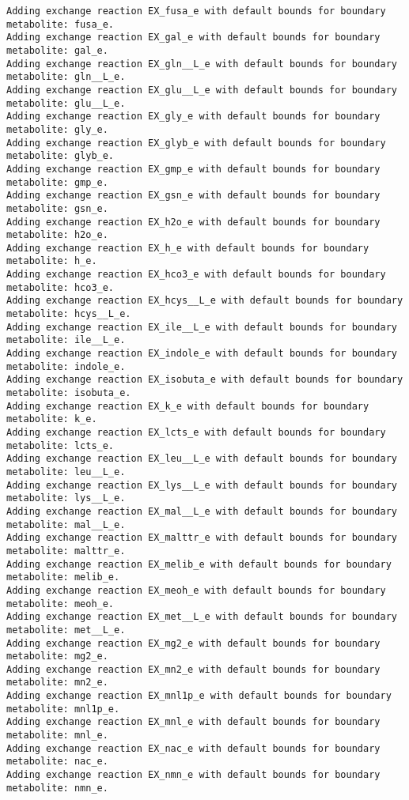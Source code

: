 \documentclass[
  letterpaper,
  DIV=11,
  numbers=noendperiod]{scrartcl}
\begin{document}
\begin{verbatim}
Adding exchange reaction EX_fusa_e with default bounds for boundary metabolite: fusa_e.
Adding exchange reaction EX_gal_e with default bounds for boundary metabolite: gal_e.
Adding exchange reaction EX_gln__L_e with default bounds for boundary metabolite: gln__L_e.
Adding exchange reaction EX_glu__L_e with default bounds for boundary metabolite: glu__L_e.
Adding exchange reaction EX_gly_e with default bounds for boundary metabolite: gly_e.
Adding exchange reaction EX_glyb_e with default bounds for boundary metabolite: glyb_e.
Adding exchange reaction EX_gmp_e with default bounds for boundary metabolite: gmp_e.
Adding exchange reaction EX_gsn_e with default bounds for boundary metabolite: gsn_e.
Adding exchange reaction EX_h2o_e with default bounds for boundary metabolite: h2o_e.
Adding exchange reaction EX_h_e with default bounds for boundary metabolite: h_e.
Adding exchange reaction EX_hco3_e with default bounds for boundary metabolite: hco3_e.
Adding exchange reaction EX_hcys__L_e with default bounds for boundary metabolite: hcys__L_e.
Adding exchange reaction EX_ile__L_e with default bounds for boundary metabolite: ile__L_e.
Adding exchange reaction EX_indole_e with default bounds for boundary metabolite: indole_e.
Adding exchange reaction EX_isobuta_e with default bounds for boundary metabolite: isobuta_e.
Adding exchange reaction EX_k_e with default bounds for boundary metabolite: k_e.
Adding exchange reaction EX_lcts_e with default bounds for boundary metabolite: lcts_e.
Adding exchange reaction EX_leu__L_e with default bounds for boundary metabolite: leu__L_e.
Adding exchange reaction EX_lys__L_e with default bounds for boundary metabolite: lys__L_e.
Adding exchange reaction EX_mal__L_e with default bounds for boundary metabolite: mal__L_e.
Adding exchange reaction EX_malttr_e with default bounds for boundary metabolite: malttr_e.
Adding exchange reaction EX_melib_e with default bounds for boundary metabolite: melib_e.
Adding exchange reaction EX_meoh_e with default bounds for boundary metabolite: meoh_e.
Adding exchange reaction EX_met__L_e with default bounds for boundary metabolite: met__L_e.
Adding exchange reaction EX_mg2_e with default bounds for boundary metabolite: mg2_e.
Adding exchange reaction EX_mn2_e with default bounds for boundary metabolite: mn2_e.
Adding exchange reaction EX_mnl1p_e with default bounds for boundary metabolite: mnl1p_e.
Adding exchange reaction EX_mnl_e with default bounds for boundary metabolite: mnl_e.
Adding exchange reaction EX_nac_e with default bounds for boundary metabolite: nac_e.
Adding exchange reaction EX_nmn_e with default bounds for boundary metabolite: nmn_e.

\end{verbatim}
\end{document}
